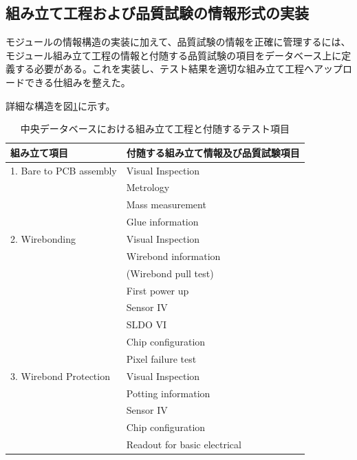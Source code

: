 \subsection{組み立て工程および品質試験の情報形式の実装}
モジュールの情報構造の実装に加えて、品質試験の情報を正確に管理するには、モジュール組み立て工程の情報と付随する品質試験の項目をデータベース上に定義する必要がある。これを実装し、テスト結果を適切な組み立て工程へアップロードできる仕組みを整えた。

詳細な構造を図\ref{pd_stage_structure}に示す。

\begin{table}[tbp]
\begin{center}
\caption[中央データベースにおける組み立て工程と付随するテスト項目]{中央データベースにおける組み立て工程と付随するテスト項目}
\label{pd_stage_structure}
  \begin{tabular}{|ll|} \hline
    組み立て項目 & 付随する組み立て情報及び品質試験項目 \\ \hline
    1. Bare to PCB assembly & Visual Inspection \\ 
                            & Metrology \\
                            & Mass measurement \\
                            & Glue information \\\hline
    2. Wirebonding          & Visual Inspection \\ 
                            & Wirebond information \\
                            & (Wirebond pull test)\\
                            & First power up\\
                            & Sensor IV\\
                            & SLDO VI\\
                            & Chip configuration\\
                            & Pixel failure test\\\hline

    3. Wirebond Protection  & Visual Inspection \\ 
                            & Potting information \\
                            & Sensor IV \\
                            & Chip configuration\\
                            & Readout for basic electrical \\\hline


\end{tabular}
\end{center}
\end{table}
